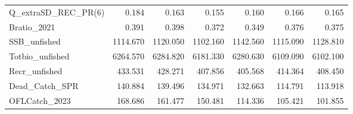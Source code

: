 \documentclass[
  english,
  a4paper,
]{article}
\begin{document}
\begin{table}
{\begin{tabular}[t]{lrrrrrr}
Q\_extraSD\_REC\_PR(6) & 0.184 & 0.163 & 0.155 & 0.160 & 0.166 & 0.165\\
Bratio\_2021 & 0.391 & 0.398 & 0.372 & 0.349 & 0.376 & 0.375\\
SSB\_unfished & 1114.670 & 1120.050 & 1102.160 & 1142.560 & 1115.090 & 1128.810\\
Totbio\_unfished & 6264.570 & 6284.820 & 6181.330 & 6280.630 & 6109.090 & 6102.100\\
Recr\_unfished & 433.531 & 428.271 & 407.856 & 405.568 & 414.364 & 408.450\\
Dead\_Catch\_SPR & 140.884 & 139.496 & 134.971 & 132.663 & 114.791 & 113.918\\
OFLCatch\_2023 & 168.686 & 161.477 & 150.481 & 114.336 & 105.421 & 101.855\\
\bottomrule
\end{tabular}}
\end{table}
\end{document}
